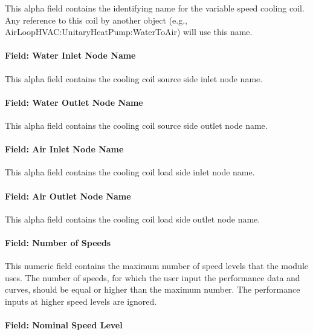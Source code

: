 This alpha field contains the identifying name for the variable speed cooling coil. Any reference to this coil by another object (e.g., AirLoopHVAC:UnitaryHeatPump:WaterToAir) will use this name.

\paragraph{Field: Water Inlet Node Name}\label{field-water-inlet-node-name-7}

This alpha field contains the cooling coil source side inlet node name.

\paragraph{Field: Water Outlet Node Name}\label{field-water-outlet-node-name-7-000}

This alpha field contains the cooling coil source side outlet node name.

\paragraph{Field: Air Inlet Node Name}\label{field-air-inlet-node-name-18}

This alpha field contains the cooling coil load side inlet node name.

\paragraph{Field: Air Outlet Node Name}\label{field-air-outlet-node-name-18}

This alpha field contains the cooling coil load side outlet node name.

\paragraph{Field: Number of Speeds}\label{field-number-of-speeds-4}

This numeric field contains the maximum number of speed levels that the module uses. The number of speeds, for which the user input the performance data and curves, should be equal or higher than the maximum number. The performance inputs at higher speed levels are ignored.

\paragraph{Field: Nominal Speed Level}\label{field-nominal-speed-level-2}

